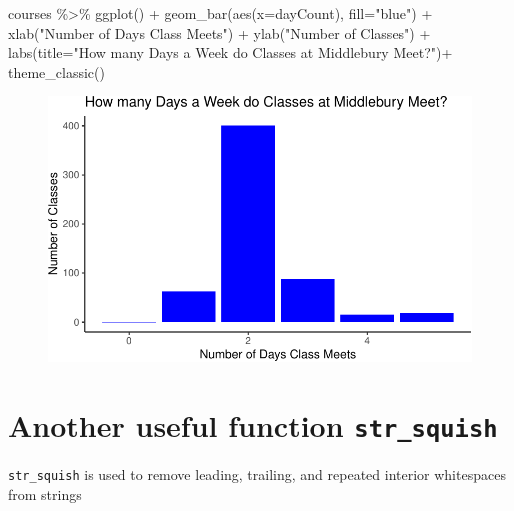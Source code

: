 \documentclass[
  letterpaper,
  DIV=11,
  numbers=noendperiod]{scrartcl}
\newenvironment{Shaded}{\begin{snugshade}}{\end{snugshade}}
\newcommand{\AttributeTok}[1]{\textcolor[rgb]{0.40,0.45,0.13}{#1}}
\newcommand{\FunctionTok}[1]{\textcolor[rgb]{0.28,0.35,0.67}{#1}}
\newcommand{\NormalTok}[1]{\textcolor[rgb]{0.00,0.23,0.31}{#1}}
\newcommand{\SpecialCharTok}[1]{\textcolor[rgb]{0.37,0.37,0.37}{#1}}
\newcommand{\StringTok}[1]{\textcolor[rgb]{0.13,0.47,0.30}{#1}}
\begin{document}
\begin{Shaded}
\begin{Highlighting}[]
\NormalTok{courses }\SpecialCharTok{\%\textgreater{}\%} 
  \FunctionTok{ggplot}\NormalTok{() }\SpecialCharTok{+} 
  \FunctionTok{geom\_bar}\NormalTok{(}\FunctionTok{aes}\NormalTok{(}\AttributeTok{x=}\NormalTok{dayCount), }\AttributeTok{fill=}\StringTok{"blue"}\NormalTok{) }\SpecialCharTok{+} 
  \FunctionTok{xlab}\NormalTok{(}\StringTok{"Number of Days Class Meets"}\NormalTok{) }\SpecialCharTok{+} 
  \FunctionTok{ylab}\NormalTok{(}\StringTok{"Number of Classes"}\NormalTok{) }\SpecialCharTok{+} 
  \FunctionTok{labs}\NormalTok{(}\AttributeTok{title=}\StringTok{"How many Days a Week do Classes at Middlebury Meet?"}\NormalTok{)}\SpecialCharTok{+}
  \FunctionTok{theme\_classic}\NormalTok{()}
\end{Highlighting}
\end{Shaded}

\begin{figure}[H]

{\centering \includegraphics{118_stringr_files/figure-pdf/unnamed-chunk-14-1.pdf}

}

\end{figure}

\hypertarget{another-useful-function-str_squish}{%
\section{\texorpdfstring{Another useful function
\texttt{str\_squish}}{Another useful function str\_squish}}\label{another-useful-function-str_squish}}

\texttt{str\_squish} is used to remove leading, trailing, and repeated
interior whitespaces from strings
\end{document}
